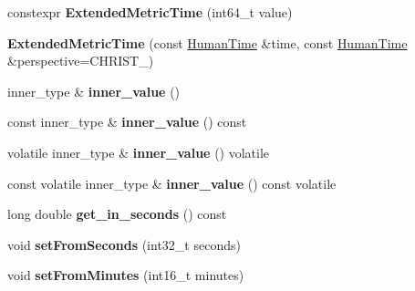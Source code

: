 \begin{DoxyCompactItemize}
constexpr {\bfseries Extended\+Metric\+Time} (int64\+\_\+t value)
\item 
\mbox{\label{classtime_1_1_extended_metric_time_a8aa5a8e27fd3be9e16a2c7f29a52c7ee}} 
{\bfseries Extended\+Metric\+Time} (const \mbox{\hyperlink{classtime_1_1_human_time}{Human\+Time}} \&time, const \mbox{\hyperlink{classtime_1_1_human_time}{Human\+Time}} \&perspective=C\+H\+R\+I\+S\+T\+\_)
\item 
\mbox{\label{classtime_1_1_extended_metric_time_a3fb83a5dbaeb1e0508c1cc1bec6c670c}} 
inner\+\_\+type \& {\bfseries inner\+\_\+value} ()
\item 
\mbox{\label{classtime_1_1_extended_metric_time_a8c34f1276a97d79684b618d3d318a0f2}} 
const inner\+\_\+type \& {\bfseries inner\+\_\+value} () const
\item 
\mbox{\label{classtime_1_1_extended_metric_time_ac9d36139ec4b1effc3602fd8a4473a2e}} 
volatile inner\+\_\+type \& {\bfseries inner\+\_\+value} () volatile
\item 
\mbox{\label{classtime_1_1_extended_metric_time_ac6152dd8d64e9e26f76aecbb665240b5}} 
const volatile inner\+\_\+type \& {\bfseries inner\+\_\+value} () const volatile
\item 
\mbox{\label{classtime_1_1_extended_metric_time_aceec43acee7156293b77676d3ba50901}} 
long double {\bfseries get\+\_\+in\+\_\+seconds} () const
\item 
\mbox{\label{classtime_1_1_extended_metric_time_a504150f5b0751cca06c6cddae4e68ce9}} 
void {\bfseries set\+From\+Seconds} (int32\+\_\+t seconds)
\item 
\mbox{\label{classtime_1_1_extended_metric_time_a5ee91e7c2de5a957af5e7f0ee1e77886}} 
void {\bfseries set\+From\+Minutes} (int16\+\_\+t minutes)
\item 
\mbox{\label{classtime_1_1_extended_metric_time_ab006e4643283e8be6537e4012c8b4213}} 

\end{DoxyCompactItemize}
